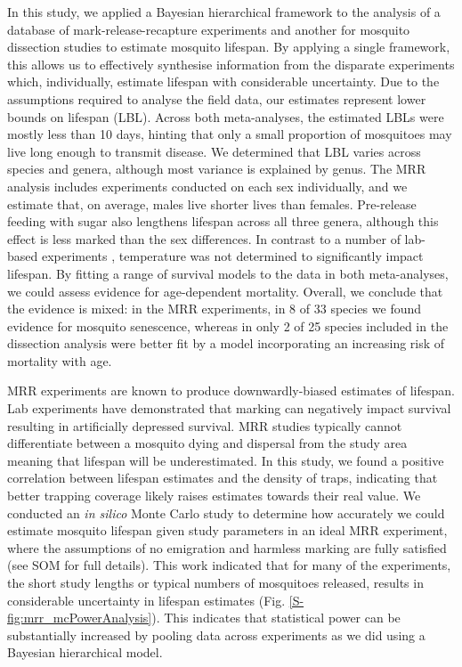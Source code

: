 \documentclass[]{article}
\begin{document}
In this study, we applied a Bayesian hierarchical framework to the
analysis of a database of mark-release-recapture experiments and another for mosquito dissection studies to estimate mosquito lifespan.
By applying a single framework, this allows us to effectively synthesise
information from the disparate experiments which, individually, estimate
lifespan with considerable uncertainty. Due to the assumptions required
to analyse the field data, our estimates represent lower bounds on
lifespan (LBL). Across both meta-analyses, the estimated LBLs were
mostly less than 10 days, hinting that only a small proportion of
mosquitoes may live long enough to transmit disease. We determined that
LBL varies across species and genera, although most variance is
explained by genus. The MRR analysis includes experiments conducted on
each sex individually, and we estimate that, on average, males live
shorter lives than females. Pre-release feeding with sugar also
lengthens lifespan across all three genera, although this effect is less
marked than the sex differences. In contrast to a number of lab-based
experiments \citep{yang2009assessing,brady2013modelling}, temperature was not determined to significantly impact
lifespan. By fitting a range of survival models to the data in both
meta-analyses, we could assess evidence for age-dependent mortality.
Overall, we conclude that the evidence is mixed: in the MRR experiments,
in 8 of 33 species we found evidence for mosquito senescence, whereas in
only 2 of 25 species included in the dissection analysis were better fit
by a model incorporating an increasing risk of mortality with age.

MRR experiments are known to produce downwardly-biased estimates of
lifespan. Lab experiments have demonstrated that marking can negatively
impact survival \citep{verhulst2013advances,dickens2014effects}
resulting in artificially depressed survival. MRR studies typically
cannot differentiate between a mosquito dying and dispersal from the
study area meaning that lifespan will be underestimated. In this study,
we found a positive correlation between lifespan estimates and the
density of traps, indicating that better trapping coverage likely raises
estimates towards their real value. We conducted an \emph{in silico}
Monte Carlo study to determine how accurately we could estimate mosquito
lifespan given study parameters in an ideal MRR experiment, where the
assumptions of no emigration and harmless marking are fully satisfied
(see SOM for full details). This work indicated that for many of the
experiments, the short study lengths or typical numbers of mosquitoes
released, results in considerable uncertainty in lifespan estimates (Fig.
\ref{S-fig:mrr_mcPowerAnalysis}). This indicates that statistical power can be substantially
increased by pooling data across experiments as we did using a Bayesian
hierarchical model.
\end{document}
